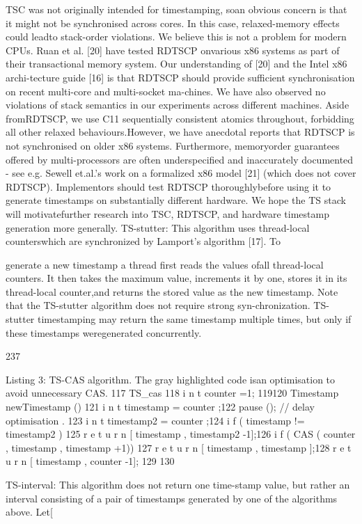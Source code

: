 TSC was not originally intended for timestamping, soan obvious concern is that it might not be synchronised
across cores. In this case, relaxed-memory effects could leadto stack-order violations. We believe this is not a problem
for modern CPUs. Ruan et al. [20] have tested RDTSCP onvarious x86 systems as part of their transactional memory
system. Our understanding of [20] and the Intel x86 archi-tecture guide [16] is that RDTSCP should provide sufficient
synchronisation on recent multi-core and multi-socket ma-chines. We have also observed no violations of stack semantics in our experiments across different machines. Aside fromRDTSCP, we use C11 sequentially consistent atomics throughout, forbidding all other relaxed behaviours.However, we have anecdotal reports that RDTSCP is not
synchronised on older x86 systems. Furthermore, memoryorder guarantees offered by multi-processors are often underspecified and inaccurately documented - see e.g. Sewell et.al.'s work on a formalized x86 model [21] (which does not
cover RDTSCP). Implementors should test RDTSCP thoroughlybefore using it to generate timestamps on substantially
different hardware. We hope the TS stack will motivatefurther research into TSC, RDTSCP, and hardware timestamp
generation more generally.
TS-stutter: This algorithm uses thread-local counterswhich are synchronized by Lamport's algorithm [17]. To

generate a new timestamp a thread first reads the values ofall thread-local counters. It then takes the maximum value,
increments it by one, stores it in its thread-local counter,and returns the stored value as the new timestamp. Note
that the TS-stutter algorithm does not require strong syn-chronization. TS-stutter timestamping may return the same
timestamp multiple times, but only if these timestamps weregenerated concurrently.

237

Listing 3: TS-CAS algorithm. The gray highlighted code isan optimisation to avoid unnecessary CAS.
117 TS_cas {118 i n t counter =1;
119120 Timestamp newTimestamp (){
121 i n t timestamp = counter ;122 pause (); // delay optimisation .
123 i n t timestamp2 = counter ;124 i f ( timestamp != timestamp2 )
125 r e t u r n [ timestamp , timestamp2 -1];126 i f ( CAS ( counter , timestamp , timestamp +1))
127 r e t u r n [ timestamp , timestamp ];128 r e t u r n [ timestamp , counter -1];
129 }130 }

TS-interval: This algorithm does not return one time-stamp value, but rather an interval consisting of a pair of
timestamps generated by one of the algorithms above. Let[

